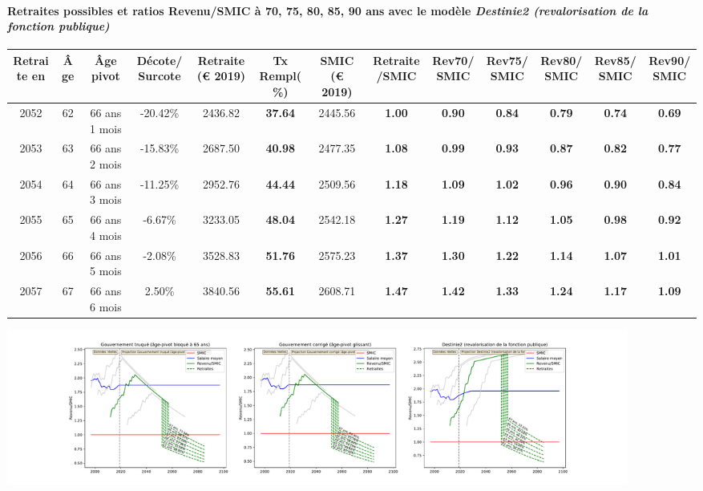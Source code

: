 \paragraph{Retraites possibles et ratios Revenu/SMIC à 70, 75, 80, 85, 90 ans avec le modèle \emph{Destinie2 (revalorisation de la fonction publique)}}  
 
{ \scriptsize \begin{center} 
\begin{tabular}[htb]{|c|c||c|c||c|c||c||c|c|c|c|c|c|} 
\hline 
 Retraite en &  Âge &  Âge pivot &  Décote/Surcote &  Retraite (\euro{} 2019) &  Tx Rempl(\%) &  SMIC (\euro{} 2019) &  Retraite/SMIC &  Rev70/SMIC &  Rev75/SMIC &  Rev80/SMIC &  Rev85/SMIC &  Rev90/SMIC \\ 
\hline \hline 
 2052 &  62 &  66 ans 1 mois &  -20.42\% &  2436.82 &  {\bf 37.64} &  2445.56 &  {\bf {\color{red} 1.00}} &  {\bf {\color{red} 0.90}} &  {\bf {\color{red} 0.84}} &  {\bf {\color{red} 0.79}} &  {\bf {\color{red} 0.74}} &  {\bf {\color{red} 0.69}} \\ 
\hline 
 2053 &  63 &  66 ans 2 mois &  -15.83\% &  2687.50 &  {\bf 40.98} &  2477.35 &  {\bf 1.08} &  {\bf {\color{red} 0.99}} &  {\bf {\color{red} 0.93}} &  {\bf {\color{red} 0.87}} &  {\bf {\color{red} 0.82}} &  {\bf {\color{red} 0.77}} \\ 
\hline 
 2054 &  64 &  66 ans 3 mois &  -11.25\% &  2952.76 &  {\bf 44.44} &  2509.56 &  {\bf 1.18} &  {\bf 1.09} &  {\bf 1.02} &  {\bf {\color{red} 0.96}} &  {\bf {\color{red} 0.90}} &  {\bf {\color{red} 0.84}} \\ 
\hline 
 2055 &  65 &  66 ans 4 mois &  -6.67\% &  3233.05 &  {\bf 48.04} &  2542.18 &  {\bf 1.27} &  {\bf 1.19} &  {\bf 1.12} &  {\bf 1.05} &  {\bf {\color{red} 0.98}} &  {\bf {\color{red} 0.92}} \\ 
\hline 
 2056 &  66 &  66 ans 5 mois &  -2.08\% &  3528.83 &  {\bf 51.76} &  2575.23 &  {\bf 1.37} &  {\bf 1.30} &  {\bf 1.22} &  {\bf 1.14} &  {\bf 1.07} &  {\bf 1.01} \\ 
\hline 
 2057 &  67 &  66 ans 6 mois &  2.50\% &  3840.56 &  {\bf 55.61} &  2608.71 &  {\bf 1.47} &  {\bf 1.42} &  {\bf 1.33} &  {\bf 1.24} &  {\bf 1.17} &  {\bf 1.09} \\ 
\hline 
\hline 
\end{tabular} 
\end{center} } 

 \begin{center}\includegraphics[width=0.9\textwidth]{fig/ProfEcoles_1990_22_dest_retraite.pdf}\end{center} \label{fig/ProfEcoles_1990_22_dest_retraite.pdf} 

